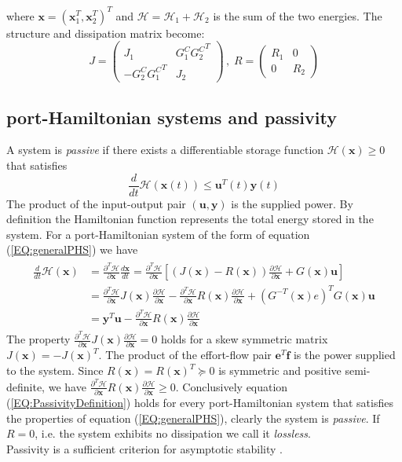 \documentclass[a4paper,twoside, openright,12pt]{report}
\newcommand{\f}[1]{\boldsymbol{#1}}
\begin{document}
{\begin{eqnarray}
\begin{aligned}
\end{aligned}
\end{eqnarray}
where $ \f{x} = (\f{x}_1^T, \f{x}_2^T)^T $ and $\mathcal{H}  = \mathcal{H}_1 + \mathcal{H}_2 $ is the sum of the two energies. The structure and dissipation matrix become:
\[J = \begin{pmatrix} J_1 & G_1^C {G_2^C}^T \\ 
-G_2^C {G_1^C}^T & J_2\end{pmatrix} \, , \; 
R = \begin{pmatrix}
R_1 & 0 \\ 0 & R_2\end{pmatrix}\]

\subsection{port-Hamiltonian systems and passivity}
A system is \emph{passive} if there exists a differentiable storage function $\mathcal{H}(\f{x}) \geq 0$ that satisfies 
\begin{equation}\label{EQ:PassivityDefinition}
\frac{d}{dt}\mathcal{H}(\f{x}(t)) \leq \f{u}^T(t) \f{y}(t)
\end{equation}
The product of the input-output pair $(\f{u},\f{y})$ is the supplied power. By definition the Hamiltonian function represents the total energy stored in the system. For a port-Hamiltonian system of the form of equation (\ref{EQ:generalPHS}) we have
\begin{eqnarray}
\begin{aligned}
\frac{d}{dt}\mathcal{H}(\f{x}) &= \frac{\partial^T \mathcal{H}}{\partial \f{x}} \frac{d\f{x}}{dt} = \frac{\partial^T \mathcal{H}}{\partial \f{x}}\left[(J(\f{x})-R(\f{x}))\frac{\partial \mathcal{H}}{\partial \f{x}} + G(\f{x})\f{u}\right]  \\
&= \frac{\partial^T \mathcal{H}}{\partial \f{x}}J(\f{x})\frac{\partial \mathcal{H}}{\partial \f{x}} - \frac{\partial^T \mathcal{H}}{\partial \f{x}}R(\f{x})\frac{\partial \mathcal{H}}{\partial \f{x}} + (G^{-T}(\f{x})e)^T G(\f{x})\f{u}  \\
&= \f{y}^T\f{u} - \frac{\partial^T \mathcal{H}}{\partial \f{x}}R(\f{x})\frac{\partial \mathcal{H}}{\partial \f{x}}
\end{aligned}
\end{eqnarray}
The property $\frac{\partial^T \mathcal{H}}{\partial \f{x}}J(\f{x})\frac{\partial \mathcal{H}}{\partial \f{x}}=0$ holds for a skew symmetric matrix $J(\f{x}) = -J(\f{x})^T$. The product of the effort-flow pair $\f{e}^T\f{f}$ is the power supplied to the system. Since $R(\f{x})=R(\f{x})^T \succeq 0$ is symmetric and positive semi-definite, we have $\frac{\partial^T \mathcal{H}}{\partial \f{x}}R(\f{x})\frac{\partial \mathcal{H}}{\partial \f{x}} \geq 0$. Conclusively equation (\ref{EQ:PassivityDefinition}) holds for every port-Hamiltonian system that satisfies the properties of equation (\ref{EQ:generalPHS}), clearly the system is \emph{passive}. If $R=0$, i.e. the system exhibits no dissipation we call it \emph{lossless}.\\
Passivity is a sufficient criterion for asymptotic stability \cite{Ortega_01}.  
}
\end{document}
